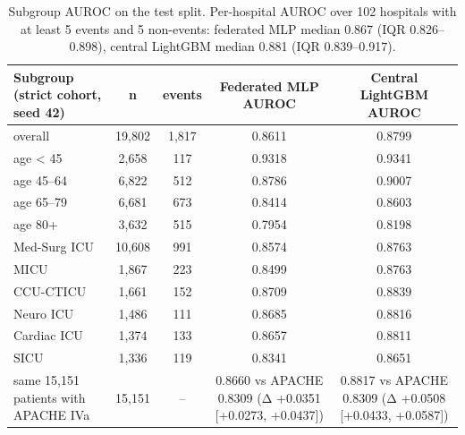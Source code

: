 \begin{table}[t]
\centering\small
\caption{Subgroup AUROC on the test split. Per-hospital AUROC over 102 hospitals with at least 5 events and 5 non-events: federated MLP median 0.867 (IQR 0.826–0.898), central LightGBM median 0.881 (IQR 0.839–0.917).}\label{tab:subgroups}
\begin{tabular}{lcccc}
\toprule
Subgroup (strict cohort, seed 42) & n & events & Federated MLP AUROC & Central LightGBM AUROC \\
\midrule
overall & 19,802 & 1,817 & 0.8611 & 0.8799 \\
age < 45 & 2,658 & 117 & 0.9318 & 0.9341 \\
age 45–64 & 6,822 & 512 & 0.8786 & 0.9007 \\
age 65–79 & 6,681 & 673 & 0.8414 & 0.8603 \\
age 80+ & 3,632 & 515 & 0.7954 & 0.8198 \\
Med-Surg ICU & 10,608 & 991 & 0.8574 & 0.8763 \\
MICU & 1,867 & 223 & 0.8499 & 0.8763 \\
CCU-CTICU & 1,661 & 152 & 0.8709 & 0.8839 \\
Neuro ICU & 1,486 & 111 & 0.8685 & 0.8816 \\
Cardiac ICU & 1,374 & 133 & 0.8657 & 0.8811 \\
SICU & 1,336 & 119 & 0.8341 & 0.8651 \\
same 15,151 patients with APACHE IVa & 15,151 & – & 0.8660 vs APACHE 0.8309 (Δ +0.0351 [+0.0273, +0.0437]) & 0.8817 vs APACHE 0.8309 (Δ +0.0508 [+0.0433, +0.0587]) \\
\bottomrule
\end{tabular}
\end{table}

